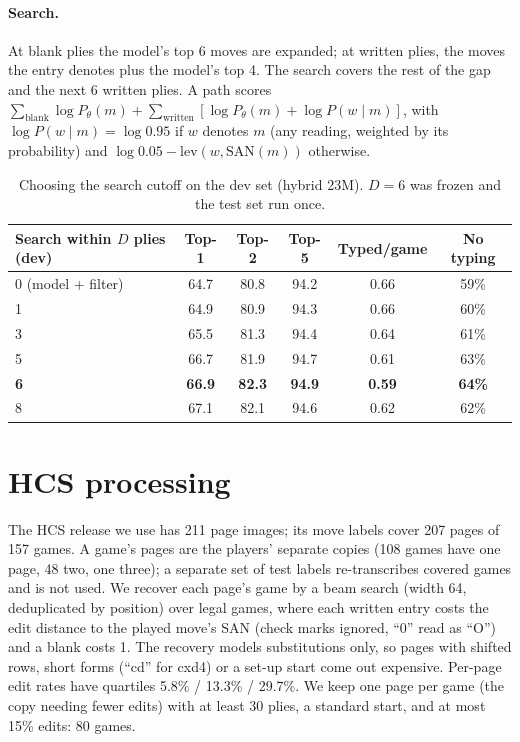 \documentclass[11pt]{article}
\begin{document}
\paragraph{Search.} At blank plies the model's top 6 moves are expanded; at written plies, the moves the entry denotes plus the model's top 4. The search covers the rest of the gap and the next 6 written plies. A path scores $\sum_{\text{blank}}\log P_\theta(m)+\sum_{\text{written}}[\log P_\theta(m)+\log P(w\mid m)]$, with $\log P(w\mid m)=\log 0.95$ if $w$ denotes $m$ (any reading, weighted by its probability) and $\log 0.05-\mathrm{lev}(w,\mathrm{SAN}(m))$ otherwise.
\begin{table}[h]
\centering\small
\begin{tabular}{lccccc}
\toprule
Search within $D$ plies (dev) & Top-1 & Top-2 & Top-5 & Typed/game & No typing \\
\midrule
0 (model + filter) & 64.7 & 80.8 & 94.2 & 0.66 & 59\% \\
1 & 64.9 & 80.9 & 94.3 & 0.66 & 60\% \\
3 & 65.5 & 81.3 & 94.4 & 0.64 & 61\% \\
5 & 66.7 & 81.9 & 94.7 & 0.61 & 63\% \\
\textbf{6} & \textbf{66.9} & \textbf{82.3} & \textbf{94.9} & \textbf{0.59} & \textbf{64\%} \\
8 & 67.1 & 82.1 & 94.6 & 0.62 & 62\% \\
\bottomrule
\end{tabular}
\caption{Choosing the search cutoff on the dev set (hybrid 23M). $D=6$ was frozen and the test set run once.}
\label{tab:dev}
\end{table}

\section{HCS processing}
\label{app:hcs}
The HCS release we use has 211 page images; its move labels cover 207 pages of 157 games. A game's pages are the players' separate copies (108 games have one page, 48 two, one three); a separate set of test labels re-transcribes covered games and is not used. We recover each page's game by a beam search (width 64, deduplicated by position) over legal games, where each written entry costs the edit distance to the played move's SAN (check marks ignored, ``0'' read as ``O'') and a blank costs 1. The recovery models substitutions only, so pages with shifted rows, short forms (``cd'' for cxd4) or a set-up start come out expensive. Per-page edit rates have quartiles 5.8\% / 13.3\% / 29.7\%. We keep one page per game (the copy needing fewer edits) with at least 30 plies, a standard start, and at most 15\% edits: 80 games.
\end{document}
